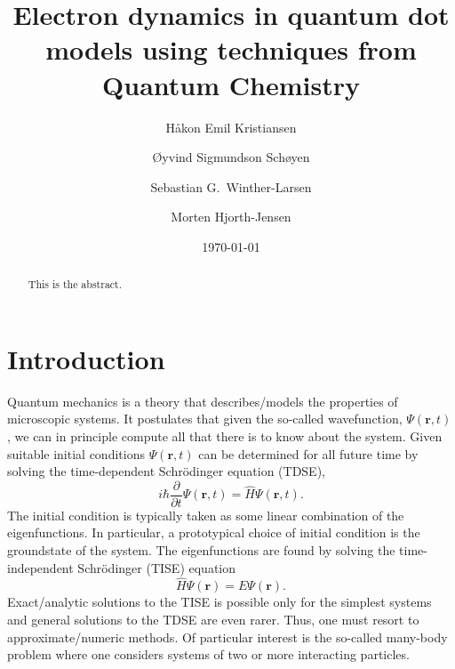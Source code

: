 \documentclass[aip,jcp,reprint,floatfix]{revtex4-1}
\begin{document}
\title{Electron dynamics in quantum dot models using techniques from Quantum Chemistry}

\author{Håkon Emil Kristiansen}

\author{\O yvind Sigmundson Sch\o yen}

\author{Sebastian G.~Winther-Larsen}


\author{Morten Hjorth-Jensen}
\date{\today}

\begin{abstract}
    This is the abstract.
\end{abstract}

\maketitle

\section{Introduction}
Quantum mechanics is a theory that describes/models the properties of microscopic systems. It postulates that given the so-called wavefunction,
$\Psi(\mathbf{r},t)$, we can in principle compute all that there is to know about the system.  Given suitable initial conditions $\Psi(\mathbf{r},t)$ can be determined for all future time
by solving the time-dependent Schrödinger equation (TDSE),
\begin{equation}
\label{TDSE}
 i \hbar \frac{\partial }{\partial t} \Psi(\mathbf{r},t) = \hat{H} \Psi(\mathbf{r},t).
\end{equation}
The initial condition is typically taken as some linear combination of the eigenfunctions. In particular, a prototypical choice of initial condition is the groundstate of the system. The eigenfunctions are found by solving the time-independent Schrödinger (TISE) equation
\begin{equation}
 \hat{H} \Psi(\mathbf{r}) = E \Psi(\mathbf{r}).
\end{equation}
Exact/analytic solutions to the TISE is possible only for the
simplest systems and general solutions to the TDSE are even
rarer. Thus, one must resort to approximate/numeric methods. Of
particular interest is the so-called many-body problem where one
considers systems of two or more interacting particles.
\end{document}
